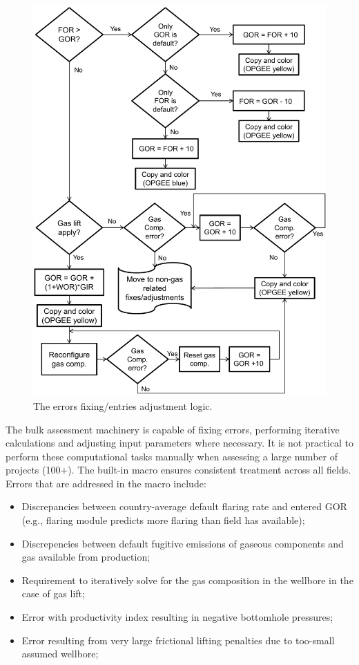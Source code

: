 \documentclass[11pt]{report}
\begin{document}
\begin{figure}[t]
\includegraphics[width=0.8\columnwidth]{images/macro_logic_2a.pdf}
\caption{The errors fixing/entries adjustment logic.}
\label{fig:macro_logic_2}
\end{figure}

The bulk assessment machinery is capable of fixing errors, performing iterative calculations and adjusting input parameters where necessary. It is not practical to perform these computational tasks manually when assessing a large number of projects (100+). The built-in macro ensures consistent treatment across all fields. Errors that are addressed in the macro include:
\begin{itemize}
\item Discrepancies between country-average default flaring rate and entered GOR (e.g., flaring module predicts more flaring than field has available);
\item Discrepencies between default fugitive emissions of gaseous components and gas available from production;
\item Requirement to iteratively solve for the gas composition in the wellbore in the case of gas lift;
\item Error with productivity index resulting in negative bottomhole pressures;
\item Error resulting from very large frictional lifting penalties due to too-small assumed wellbore;
\end{itemize}
\end{document}

